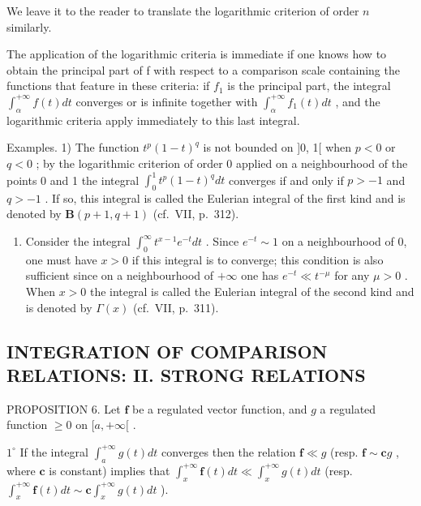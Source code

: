 We leave it to the reader to translate the logarithmic criterion of order \(n\) similarly.

The application of the logarithmic criteria is immediate if one knows how to obtain the principal part of f with respect to a comparison scale containing the functions that feature in these criteria: if \(f_{1}\) is the principal part, the integral \(\int_{\alpha}^{+\infty} f(t) dt\) converges or is infinite together with \(\int_{\alpha}^{+\infty} f_{1}(t) dt\) , and the logarithmic criteria apply immediately to this last integral.

Examples. 1) The function \(t^p (1 - t)^q\) is not bounded on {]}0, 1{[} when \(p < 0\) or \(q < 0\) ; by the logarithmic criterion of order 0 applied on a neighbourhood of the points 0 and 1 the integral \(\int_0^1 t^p (1 - t)^q dt\) converges if and only if \(p > -1\) and \(q > -1\) . If so, this integral is called the Eulerian integral of the first kind and is denoted by \(\mathbf{B}(p + 1,q + 1)\) (cf.~VII, p.~312).

\begin{enumerate}
\def\labelenumi{\arabic{enumi})}
\setcounter{enumi}{1}
\tightlist
\item
  Consider the integral \(\int_0^\infty t^{x - 1}e^{-t}dt\) . Since \(e^{-t}\sim 1\) on a neighbourhood of 0, one must have \(x > 0\) if this integral is to converge; this condition is also sufficient since on a neighbourhood of \(+\infty\) one has \(e^{-t}\ll t^{-\mu}\) for any \(\mu >0\) . When \(x > 0\) the integral is called the Eulerian integral of the second kind and is denoted by \(\Gamma (x)\) (cf.~VII, p.~311).
\end{enumerate}

\subsection{INTEGRATION OF COMPARISON RELATIONS: II. STRONG RELATIONS}

PROPOSITION 6. Let \(\mathbf{f}\) be a regulated vector function, and \(g\) a regulated function \(\geqslant 0\) on \([a, +\infty[\) .

\(1^{\circ}\) If the integral \(\int_{a}^{+\infty} g(t) dt\) converges then the relation \(\mathbf{f} \ll g\) (resp. \(\mathbf{f} \sim \mathbf{c}g\) , where \(\mathbf{c}\) is constant) implies that \(\int_{x}^{+\infty} \mathbf{f}(t) dt \ll \int_{x}^{+\infty} g(t) dt\) (resp. \(\int_{x}^{+\infty} \mathbf{f}(t) dt \sim \mathbf{c} \int_{x}^{+\infty} g(t) dt\) ).

